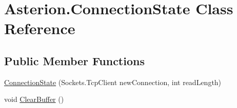 \hypertarget{classAsterion_1_1ConnectionState}{\section{Asterion.\-Connection\-State Class Reference}
\label{classAsterion_1_1ConnectionState}
}
\subsection*{Public Member Functions}
\begin{DoxyCompactItemize}
\item 
\hyperlink{classAsterion_1_1ConnectionState_a8e08c3d60a2f4a31954dcd8c61821f86}{Connection\-State} (Sockets.\-Tcp\-Client new\-Connection, int read\-Length)
\item 
void \hyperlink{classAsterion_1_1ConnectionState_adb7e53b007721e767ecc12b7ad2774ac}{Clear\-Buffer} ()
\end{DoxyCompactItemize}

